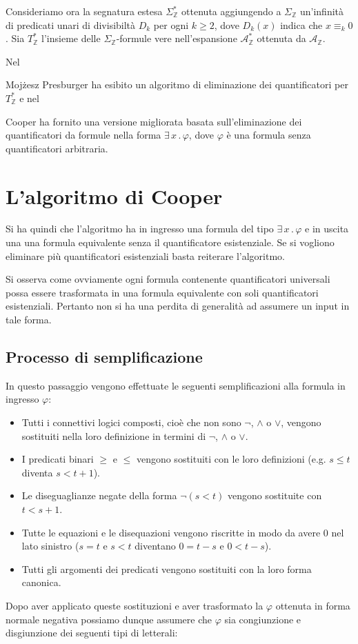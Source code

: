 \documentclass[11pt,letterpaper,twoside]{article}
\begin{document}
Consideriamo ora la segnatura estesa $\Sigma_{\mathbb{Z}}^*$ ottenuta
aggiungendo a $\Sigma_{\mathbb{Z}}$ un'infinità di predicati unari di
divisibiltà $D_k$ per ogni $k \ge 2$, dove $D_k(x)$ indica che $x \equiv_k 0$.
Sia $T_{\mathbb{Z}}^*$ l'insieme delle $\Sigma_{\mathbb{Z}}$-formule vere
nell'espansione $\mathcal{A}_{\mathbb{Z}}^*$ ottenuta da
$\mathcal{A}_{\mathbb{Z}}$.

Nel \date{1930} Moj\.zesz Presburger ha esibito un algoritmo di eliminazione dei
quantificatori\autocite{presburger} per $T_{\mathbb{Z}}^*$ e nel \date{1972}
Cooper ha fornito una versione migliorata basata sull'eliminazione dei
quantificatori da formule nella forma $\exists \,x \,.\, \varphi$, dove
$\varphi$ è una formula senza quantificatori arbitraria.

\section{L'algoritmo di Cooper} Si ha quindi che l'algoritmo ha in ingresso una
formula del tipo $\exists \,x \,.\, \varphi$ e in uscita una una formula
equivalente senza il quantificatore esistenziale. Se si vogliono eliminare pi\`u
quantificatori esistenziali basta reiterare l'algoritmo.

Si osserva come ovviamente ogni formula contenente quantificatori universali
possa essere trasformata in una formula equivalente con soli quantificatori
esistenziali.  Pertanto non si ha una perdita di generalità ad assumere un input
in tale forma.

\subsection{Processo di semplificazione} In questo passaggio vengono effettuate
le seguenti semplificazioni alla formula in ingresso $\varphi$:
\begin{itemize}
\item Tutti i connettivi logici composti, cioè che non sono $\lnot$, $\land$ o
$\lor$, vengono sostituiti nella loro definizione in termini di $\lnot$, $\land$
o $\lor$.
\item I predicati binari $\ge$ e $\le$ vengono sostituiti con le loro
definizioni (e.g. $s \le t$ diventa $s < t + 1$).
\item Le diseguaglianze negate della forma $\lnot (s < t)$ vengono sostituite
con $t < s + 1$.
\item Tutte le equazioni e le disequazioni vengono riscritte in modo da avere
$0$ nel lato sinistro ($s=t$ e $s<t$ diventano $0=t-s$ e $0<t-s$).
\item Tutti gli argomenti dei predicati vengono sostituiti con la loro forma
canonica.
\end{itemize} Dopo aver applicato queste sostituzioni e aver trasformato la
$\varphi$ ottenuta in forma normale negativa possiamo dunque assumere che
$\varphi$ sia congiunzione e disgiunzione dei seguenti tipi di letterali:
\end{document}
